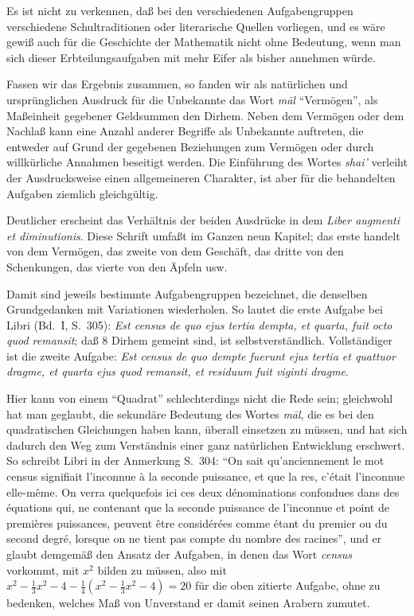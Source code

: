 \documentclass[11pt,a4paper]{article}
\newcommand{\enquote}[1]{``#1''}
\begin{document}
Es ist nicht zu verkennen, da\ss{} bei den verschiedenen Aufgabengruppen verschiedene Schultraditionen oder literarische Quellen vorliegen, und es w\"are gewi\ss{} auch f\"ur die Geschichte der Mathematik nicht ohne Bedeutung, wenn man sich dieser Erbteilungsaufgaben mit mehr Eifer als bisher annehmen w\"urde.

Fassen wir das Ergebnis zusammen, so fanden wir als nat\"urlichen und urspr\"unglichen Ausdruck f\"ur die Unbekannte das Wort \textit{m\=al} \enquote{Verm\"ogen}, als Ma\ss{}einheit gegebener Geldsummen den Dirhem. Neben dem Verm\"ogen oder dem Nachla\ss{} kann eine Anzahl anderer Begriffe als Unbekannte auftreten, die entweder auf Grund der gegebenen Beziehungen zum Verm\"ogen oder durch willk\"urliche Annahmen beseitigt werden. Die Einf\"uhrung des Wortes \textit{shai'} verleiht der Ausdrucksweise einen allgemeineren Charakter, ist aber f\"ur die behandelten Aufgaben ziemlich gleichg\"ultig.

Deutlicher erscheint das Verh\"altnis der beiden Ausdr\"ucke in dem \textit{Liber augmenti et diminutionis}. Diese Schrift umfa\ss{}t im Ganzen neun Kapitel; das erste handelt von dem Verm\"ogen, das zweite von dem Gesch\"aft, das dritte von den Schenkungen, das vierte von den \"Apfeln usw.

Damit sind jeweils bestimmte Aufgabengruppen bezeichnet, die denselben Grundgedanken mit Variationen wiederholen. So lautet die erste Aufgabe bei Libri (Bd.\ I, S.\ 305): \textit{Est census de quo ejus tertia dempta, et quarta, fuit octo quod remansit}; da\ss{} 8 Dirhem gemeint sind, ist selbstverst\"andlich. Vollst\"andiger ist die zweite Aufgabe: \textit{Est census de quo dempte fuerunt ejus tertia et quattuor dragme, et quarta ejus quod remansit, et residuum fuit viginti dragme}.

Hier kann von einem \enquote{Quadrat} schlechterdings nicht die Rede sein; gleichwohl hat man geglaubt, die sekund\"are Bedeutung des Wortes \textit{m\=al}, die es bei den quadratischen Gleichungen haben kann, \"uberall einsetzen zu m\"ussen, und hat sich dadurch den Weg zum Verst\"andnis einer ganz nat\"urlichen Entwicklung erschwert. So schreibt Libri in der Anmerkung S.\ 304: \enquote{On sait qu'anciennement le mot census signifiait l'inconnue \`a la seconde puissance, et que la res, c'\'etait l'inconnue elle-m\^eme. On verra quelquefois ici ces deux d\'enominations confondues dans des \'equations qui, ne contenant que la seconde puissance de l'inconnue et point de premi\`eres puissances, peuvent \^etre consid\'er\'ees comme \'etant du premier ou du second degr\'e, lorsque on ne tient pas compte du nombre des racines}, und er glaubt demgem\"a\ss{} den Ansatz der Aufgaben, in denen das Wort \textit{census} vorkommt, mit $x^{2}$ bilden zu m\"ussen, also mit $x^{2} - \frac{1}{3}x^{2} - 4 - \frac{1}{4}(x^{2} - \frac{1}{3}x^{2} - 4) = 20$ f\"ur die oben zitierte Aufgabe, ohne zu bedenken, welches Ma\ss{} von Unverstand er damit seinen Arabern zumutet.
\end{document}
